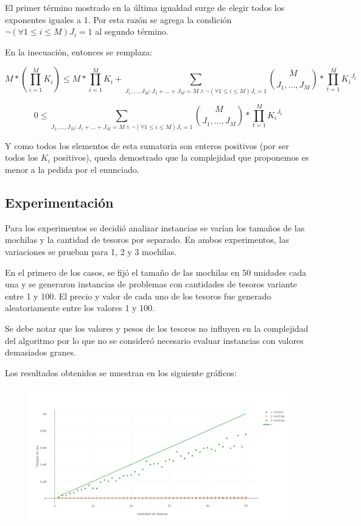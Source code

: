 El primer término mostrado en la última igualdad surge de elegir todos los exponentes iguales a 1. Por esta razón se agrega la condición $\lnot (\forall 1 \leq i \leq M) J_i = 1$ al segundo término.

En la inecuación, entonces se remplaza:

\[
M*\left(\prod_{i=1}^{M}{K_i}\right) \leq M * \prod_{i=1}^M K_i + 
\sum_{ J_1,\dots,J_M : J_1 + \dots + J_M = M \land  \lnot (\forall 1 \leq i \leq M) J_i = 1}\binom{M}{ J_1,...,J_M}*\prod_{t=1}^{M}{K_i}^{J_t}
\]

\[
0\leq \sum_{ J_1,\dots,J_M : J_1 + \dots + J_M = M \land  \lnot (\forall 1 \leq i \leq M) J_i = 1}\binom{M}{ J_1,...,J_M}*\prod_{t=1}^{M}{K_i}^{J_t}
\]


Y como todos los elementos de esta sumatoria son enteros positivos (por ser todos los $K_i$ positivos), queda demostrado que la complejidad que proponemos es menor a la pedida por el enunciado.

\subsection{Experimentación}
Para los experimentos se decidió analizar instancias se varían los tamaños de las mochilas y la cantidad de tesoros por separado. En ambos experimentos, las variaciones se prueban para 1, 2 y 3 mochilas.

En el primero de los casos, se fijó el tamaño de las mochilas en 50 unidades cada una y se generaron instancias de problemas con cantidades de tesoros variante entre 1 y 100. El precio y valor de cada uno de los tesoros fue generado aleatoriamente entre los valores 1 y 100.

Se debe notar que los valores y pesos de los tesoros no influyen en la complejidad del algoritmo por lo que no se consideró necesario evaluar instancias con valores demasiados granes.

Los resultados obtenidos se muestran en los siguiente gráficos:
\begin{figure}[H]
    \centering
    \includegraphics[width=\textwidth]{./imagenes/3-1.png}
\end{figure}

